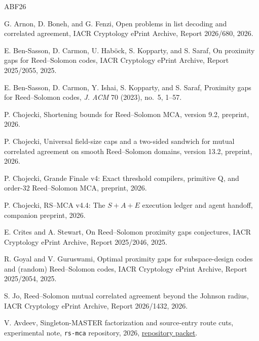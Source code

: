 \documentclass[11pt,a4paper]{amsart}
\numberwithin{equation}{section}
\theoremstyle{remark}
\begin{document}
\begin{thebibliography}{ABF26}

G. Arnon, D. Boneh, and G. Fenzi,
\newblock Open problems in list decoding and correlated agreement,
\newblock IACR Cryptology ePrint Archive, Report 2026/680, 2026.

E. Ben-Sasson, D. Carmon, U. Hab\"ock, S. Kopparty, and S. Saraf,
\newblock On proximity gaps for Reed--Solomon codes,
\newblock IACR Cryptology ePrint Archive, Report 2025/2055, 2025.

E. Ben-Sasson, D. Carmon, Y. Ishai, S. Kopparty, and S. Saraf,
\newblock Proximity gaps for Reed--Solomon codes,
\newblock \emph{J. ACM} 70 (2023), no.~5, 1--57.

P. Chojecki,
\newblock Shortening bounds for Reed--Solomon MCA,
\newblock version 9.2, preprint, 2026.

P. Chojecki,
\newblock Universal field-size caps and a two-sided sandwich for mutual correlated agreement on smooth Reed--Solomon domains,
\newblock version 13.2, preprint, 2026.

P. Chojecki,
\newblock Grande Finale v4: Exact threshold compilers, primitive Q, and order-$32$ Reed--Solomon MCA,
\newblock preprint, 2026.

P. Chojecki,
\newblock RS--MCA v4.4: The $S{+}A{+}E$ execution ledger and agent handoff,
\newblock companion preprint, 2026.

E. Crites and A. Stewart,
\newblock On Reed--Solomon proximity gaps conjectures,
\newblock IACR Cryptology ePrint Archive, Report 2025/2046, 2025.

R. Goyal and V. Guruswami,
\newblock Optimal proximity gaps for subspace-design codes and (random) Reed--Solomon codes,
\newblock IACR Cryptology ePrint Archive, Report 2025/2054, 2025.

S. Jo,
\newblock Reed--Solomon mutual correlated agreement beyond the Johnson radius,
\newblock IACR Cryptology ePrint Archive, Report 2026/1432, 2026.


V. Avdeev,
\newblock Singleton-MASTER factorization and source-entry route cuts,
\newblock experimental note, \texttt{rs-mca} repository, 2026,
\newblock \href{https://github.com/przchojecki/rs-mca/pull/1063}{repository packet}.


\end{thebibliography}
\end{document}
